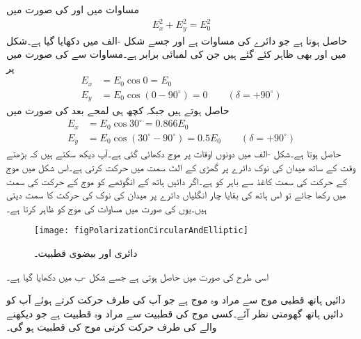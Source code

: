 مساوات  میں  اور  کی صورت میں
\begin{align}\label{مساوات_قطبیت_عمومی_دائری_قطبیت}
E_x^2 +E_y^2=E_{0}^2
\end{align}
حاصل ہوتا ہے جو دائرے کی مساوات ہے اور جسے شکل -الف میں دکھایا گیا ہے۔شکل میں  اور  بھی ظاہر کئے گئے ہیں جن کی لمبائی برابر ہے۔مساوات  سے  کی صورت میں  پر 
\begin{align*}
E_x&=E_{0} \cos 0=E_{0}\\  
E_y&=E_{0} \cos (0  -90^\circ) =0  \quad \quad (\delta =+90^\circ)
\end{align*}
حاصل ہوتے ہیں جبکہ کچھ ہی لمحے بعد  کی صورت میں
\begin{align*}
E_x&=E_{0} \cos 30^\circ=0.866 E_{0} \\
E_y&=E_{0} \cos (30^\circ  -90^\circ) =0.5 E_{0} \quad \quad (\delta =+90^\circ)
\end{align*}
حاصل ہوتا ہے۔شکل -الف میں دونوں اوقات پر موج دکھائی گئی ہے۔آپ دیکھ سکتے ہیں کہ بڑھتے وقت کے ساتھ میدان کی نوک دائرے پر گھڑی کے الٹ سمت میں حرکت کرتی ہے۔اس شکل میں موج کے حرکت کی سمت  کاغذ سے باہر کو ہے۔اگر دائیں ہاتھ کے انگوٹھے کو موج کے حرکت کی سمت میں رکھا جائے تو اس ہاتھ کی بقایا چار انگلیاں دائرے پر میدان کی نوک کی حرکت کا سمت دیتی ہیں۔یوں  کی صورت میں مساوات   کی موج کو ظاہر کرتا ہے۔   
\begin{figure}
\centering
\texttt{[image: figPolarizationCircularAndElliptic]}
\caption{دائری اور بیضوی قطبیت۔}
\label{شکل_قطبیت_دائری_اور_بیضوی_قطبیت}
\end{figure}

اسی طرح  کی صورت میں  حاصل ہوتی ہے جسے شکل -ب میں دکھایا گیا ہے۔

دائیں ہاتھ قطبی موج سے مراد وہ موج ہے جو آپ کی طرف حرکت کرتے ہوئے آپ کو دائیں ہاتھ گھومتی نظر آئے۔کسی موج کی قطبیت سے مراد وہ قطبیت ہے جو دیکھنے والے کی طرف حرکت کرتی موج کی قطبیت ہو گی۔

